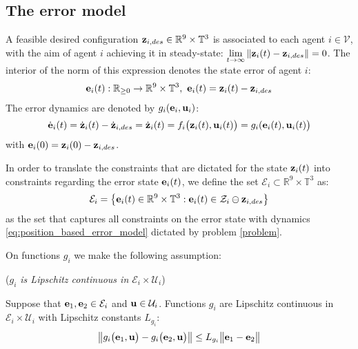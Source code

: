 \subsection{The error model}

A feasible desired configuration
$\bm{\mathbf{z}}_{i,des} \in \mathbb{R}^9 \times \mathbb{T}^3$
is associated to each agent $i \in \mathcal{V}$, with the aim of agent $i$
achieving it in steady-state:
$\lim\limits_{t \to \infty} \|\bm{\mathbf{z}}_i(t) - \bm{\mathbf{z}}_{i,des}\| = 0$. The
interior of the norm of this expression denotes the state error of agent $i$:
\begin{align}
  \bm{\mathbf{e}}_i(t) : \mathbb{R}_{\geq 0} \to \mathbb{R}^9 \times \mathbb{T}^3,\
  \bm{\mathbf{e}}_i(t) = \bm{\mathbf{z}}_i(t) - \bm{\mathbf{z}}_{i,des}
\end{align}
The error dynamics are denoted by $g_i(\bm{\mathbf{e}}_i, \bm{\mathbf{u}}_i)$:
\begin{align}
  \dot{\bm{\mathbf{e}}}_i(t) = \dot{\bm{\mathbf{z}}}_i(t) - \dot{\bm{\mathbf{z}}}_{i,des} =
  \dot{\bm{\mathbf{z}}}_i(t) = f_i\big(\bm{\mathbf{z}}_i(t), \bm{\mathbf{u}}_i(t)\big) = g_i(\bm{\mathbf{e}}_i(t), \bm{\mathbf{u}}_i(t)\big)
  \label{eq:position_based_error_model}
\end{align}
with $\bm{\mathbf{e}}_i(0) = \bm{\mathbf{z}}_i(0) - \bm{\mathbf{z}}_{i,des}$.

In order to translate
the constraints that are dictated for the state $\bm{\mathbf{z}}_i(t)$ into constraints
regarding the error state $\bm{\mathbf{e}}_i(t)$, we define the set
$\mathcal{E}_i \subset \mathbb{R}^9 \times \mathbb{T}^3$ as:
$$\mathcal{E}_i = \big\{\bm{\mathbf{e}}_i(t) \in \mathbb{R}^9 \times \mathbb{T}^3 :
\bm{\mathbf{e}}_i(t) \in \mathcal{Z}_i \ominus \bm{\mathbf{z}}_{i,des}\big\}$$
as the set that captures all constraints on the error state with dynamics
\eqref{eq:position_based_error_model} dictated by problem \eqref{problem}.

On functions $g_i$ we make the following assumption:
\begin{bw_box}
  \begin{assumption} (\textit{$g_i$ is Lipschitz continuous in $\mathcal{E}_i \times \mathcal{U}_i$})
  \label{ass:g_i_Lipschitz}

    Suppose that $\bm{\mathbf{e}}_1, \bm{\mathbf{e}}_2 \in \mathcal{E}_i$ and
    $\bm{\mathbf{u}} \in \mathcal{U}_i$. Functions $g_i$ are Lipschitz continuous in
    $\mathcal{E}_i \times \mathcal{U}_i$ with Lipschitz constants $L_{g_i}$:
    \begin{align}
      \big\|g_i\big(\bm{\mathbf{e}}_1, \bm{\mathbf{u}} \big) - g_i\big(\bm{\mathbf{e}}_2, \bm{\mathbf{u}} \big)\big\|
        \leq L_{g_i} \big\|\bm{\mathbf{e}}_1 - \bm{\mathbf{e}}_2\big\|
    \end{align}

\end{assumption}
\end{bw_box}

